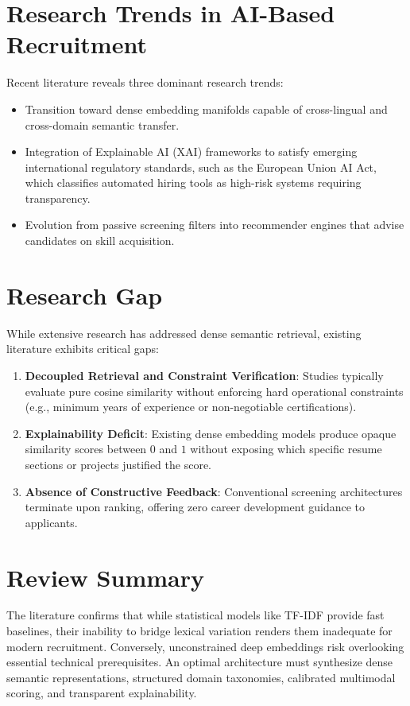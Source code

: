 \documentclass[12pt,a4paper]{report}
\begin{document}
\section{Research Trends in AI-Based Recruitment}
Recent literature reveals three dominant research trends:
\begin{itemize}
    \item Transition toward dense embedding manifolds capable of cross-lingual and cross-domain semantic transfer.
    \item Integration of Explainable AI (XAI) frameworks to satisfy emerging international regulatory standards, such as the European Union AI Act, which classifies automated hiring tools as high-risk systems requiring transparency.
    \item Evolution from passive screening filters into recommender engines that advise candidates on skill acquisition.
\end{itemize}

\section{Research Gap}
While extensive research has addressed dense semantic retrieval, existing literature exhibits critical gaps:
\begin{enumerate}
    \item \textbf{Decoupled Retrieval and Constraint Verification}: Studies typically evaluate pure cosine similarity without enforcing hard operational constraints (e.g., minimum years of experience or non-negotiable certifications).
    \item \textbf{Explainability Deficit}: Existing dense embedding models produce opaque similarity scores between $0$ and $1$ without exposing which specific resume sections or projects justified the score.
    \item \textbf{Absence of Constructive Feedback}: Conventional screening architectures terminate upon ranking, offering zero career development guidance to applicants.
\end{enumerate}

\section{Review Summary}
The literature confirms that while statistical models like TF-IDF provide fast baselines, their inability to bridge lexical variation renders them inadequate for modern recruitment. Conversely, unconstrained deep embeddings risk overlooking essential technical prerequisites. An optimal architecture must synthesize dense semantic representations, structured domain taxonomies, calibrated multimodal scoring, and transparent explainability.
\end{document}
